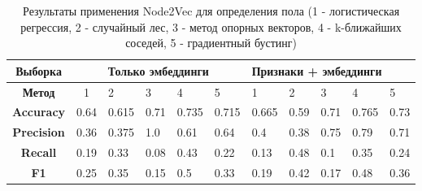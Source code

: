 \begin{table}[h!]
\centering
\begin{tabular}{|c|c|l|l|l|l|l|l|l|l|l|}
\hline
\textbf{Выборка}   & \multicolumn{5}{c|}{Только эмбеддинги} & \multicolumn{5}{l|}{Признаки + эмбеддинги} \\ \hline
\textbf{Метод}     & 1                      & 2 & 3 & 4 & 5 & 1      & 2      & 3      & 4      & 5      \\ \hline
\textbf{Accuracy}  &     0.64                   & 0.615  & 0.71   & 0.735  & 0.715  &   0.665     &  0.59      &0.71        & 0.765        &  0.73      \\ \hline
\textbf{Precision} &       0.36                &  0.375 & 1.0  & 0.61  & 0.64  &     0.4   &   0.38     &   0.75     &  0.79      & 0.71       \\ \hline
\textbf{Recall}    &      0.19                  & 0.33  & 0.08   & 0.43  & 0.22  &    0.13    &   0.48     &  0.1       &       0.35  &   0.24    \\ \hline
\textbf{F1}        &     0.25                    &  0.35 & 0.15   &  0.5 &  0.33 &    0.19    &     0.42   &   0.17     &  0.48      & 0.36        \\ \hline
\end{tabular}
\caption{Результаты применения Node2Vec для определения пола (1 - логистическая регрессия, 2 - случайный лес, 3 - метод опорных векторов, 4 - k-ближайших соседей, 5 - градиентный бустинг)}
\label{Node2Vec gender table}
\end{table}




\clearpage